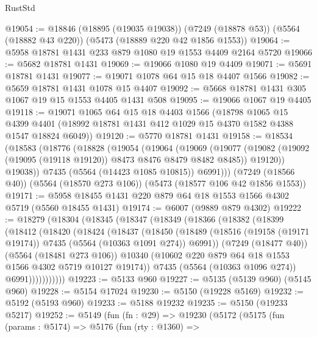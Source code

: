 \begin{lexlean}{RustStd}
\begin{coremodule}
@19054 := @18846
    (@18895 (@19035 @19038))
    (@7249 (@18878 @53))
    (@5564 (@18882 @43 @220))
    (@5473 (@18889 @220 @42 @1856 @1553))
@19064 := @5958 @18781 @1431 @233 @879 @1080 @19 @1553 @4409 @2164 @5720
@19066 := @5682 @18781 @1431
@19069 := @19066 @1080 @19 @4409
@19071 := @5691 @18781 @1431
@19077 := @19071 @1078 @64 @15 @18 @4407 @1566
@19082 := @5659 @18781 @1431 @1078 @15 @4407
@19092 := @5668 @18781 @1431 @305 @1067 @19 @15 @1553 @4405 @1431 @508
@19095 := @19066 @1067 @19 @4405
@19118 := @19071
    @1065
    @64
    @15
    @18
    @4403
    @1566
    (@18798
      @1065
      @15
      @4399
      @4401
      (@18992 @18781 @1431 @412 @1029 @15 @4370 @1582 @4388 @1547 @18824 @6049))
@19120 := @5770 @18781 @1431
@19158 := @18534
    (@18583
      (@18776
        (@18828
          (@19054
            (@19064
              (@19069
                (@19077
                  (@19082 (@19092 (@19095 (@19118 @19120)) @8473 @8476 @8479 @8482 @8485))
                  @19120))
              @19038))
          @7435
          (@5564 (@14423 @1085 @10815))
          @6991)))
    (@7249 (@18566 @40))
    (@5564 (@18570 @273 @106))
    (@5473 (@18577 @106 @42 @1856 @1553))
@19171 := @5958 @18455 @1431 @220 @879 @64 @18 @1553 @1566 @4302 @5719 (@5560 @18455 @1431)
@19174 := @6007 (@9889 @879 @4302)
@19222 := @18279
    (@18304
      (@18345
        (@18347
          (@18349
            (@18366
              (@18382
                (@18399
                  (@18412
                    (@18420
                      (@18424
                        (@18437
                          (@18450
                            (@18489
                              (@18516
                                (@19158 (@19171 @19174))
                                @7435
                                (@5564 (@10363 @1091 @274))
                                @6991))
                            (@7249 (@18477 @40))
                            (@5564 (@18481 @273 @106))
                            @10340
                            (@10602 @220 @879 @64 @18 @1553 @1566 @4302 @5719 @10127 @19174))
                          @7435
                          (@5564 (@10363 @1096 @274))
                          @6991)))))))))))
@19223 := @5133 @960
@19227 := @5135 (@5139 @960) (@5145 @960)
@19228 := @5154 @17024
@19230 := @5150 (@19228 @5169)
@19232 := @5192 (@5193 @960)
@19233 := @5188 @19232
@19235 := @5150 (@19233 @5217)
@19252 := @5149
    (fun (fn : @29) =>
    @19230
      (@5172
        (@5175
          (fun (params : @5174) =>
          @5176
            (fun (rty : @1360) =>

\end{coremodule}
\end{lexlean}

